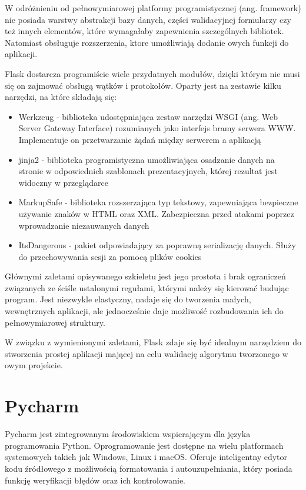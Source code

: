 W odróżnieniu od pełnowymiarowej platformy programistycznej (ang. framework) nie posiada warstwy abstrakcji bazy danych, części walidacyjnej formularzy czy też innych elementów, które wymagałaby zapewnienia szczególnych bibliotek. Natomiast obsługuje rozszerzenia, ktore umożliwiają dodanie owych funkcji do aplikacji.

Flask dostarcza programiście wiele przydatnych modułów, dzięki którym nie musi się on zajmować obsługą wątków i protokołów. Oparty jest na zestawie kilku narzędzi, na które składają się:
\begin{itemize}
\item Werkzeug - biblioteka udostępniająca zestaw narzędzi WSGI (ang. Web Server Gateway Interface) rozumianych jako interfejs bramy serwera WWW. Implementuje on przetwarzanie żądań między serwerem a aplikacją
\item jinja2 - biblioteka programistyczna umożliwiająca osadzanie danych na stronie w odpowiednich szablonach prezentacyjnych, której rezultat jest widoczny w przeglądarce
\item MarkupSafe - biblioteka rozszerzająca typ tekstowy, zapewniająca bezpieczne używanie znaków w HTML oraz XML. Zabezpieczna przed atakami poprzez wprowadzanie niezauwanych danych
\item ItsDangerous - pakiet odpowiadający za poprawną serializację danych. Służy do przechowywania sesji za pomocą plików cookies
\end{itemize}

Głównymi zaletami opisywanego szkieletu jest jego prostota i brak ograniczeń związanych ze ściśle ustalonymi regułami, którymi należy się kierować budując program. Jest niezwykle elastyczny, nadaje się do tworzenia małych, wewnętrznych aplikacji, ale jednocześnie daje możliwość rozbudowania ich do pełnowymiarowej struktury. 

W związku z wymienionymi zaletami, Flask zdaje się być idealnym narzędziem do stworzenia prostej aplikacji mającej na celu walidację algorytmu tworzonego w owym projekcie.


\section{Pycharm}
Pycharm \cite{pycharm} jest zintegrowanym środowiskiem wspierającym dla języka programowania Python. Oprogramowanie jest dostępne na wielu platformach systemowych takich jak Windows, Linux i macOS. Oferuje inteligentny edytor kodu źródłowego z możliwością formatowania i autouzupełniania, który posiada funkcję weryfikacji błędów oraz ich kontrolowanie.

